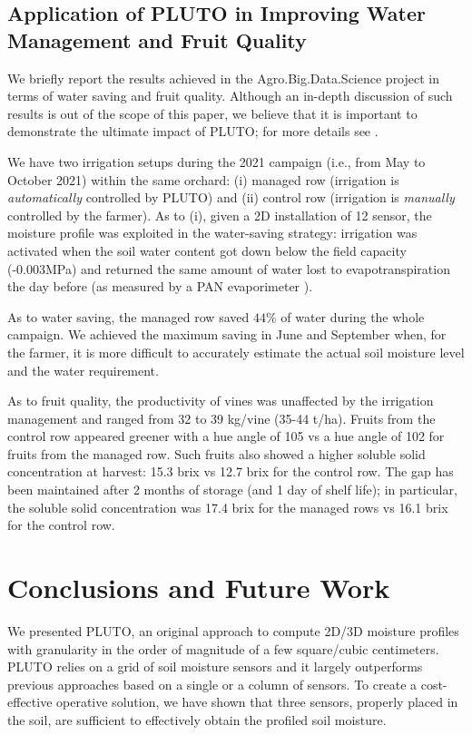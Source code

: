 \subsection{Application of PLUTO in Improving Water Management and Fruit Quality}
\label{pluto-sec:FruitQuality}
We briefly report the results achieved in the Agro.Big.Data.Science project in terms of water saving and fruit quality. Although an in-depth discussion of such results is out of the scope of this paper, we believe that it is important to demonstrate the ultimate impact of PLUTO; for more details see \cite{quartieri2021effect}. 

We have two irrigation setups during the 2021 campaign (i.e., from May to October 2021) within the same orchard: (i) managed row (irrigation is \textit{automatically} controlled by PLUTO) and (ii) control row (irrigation is \textit{manually} controlled by the farmer). As to (i), given a 2D installation of 12 sensor, the moisture profile was exploited in the water-saving strategy: irrigation was activated when the soil water content got down below the field capacity (-0.003MPa) and returned the same amount of water lost to evapotranspiration the day before (as measured by a PAN evaporimeter \cite{quartieri2021effect}).

As to water saving, the managed row saved $44\%$ of water during the whole campaign. We achieved the maximum saving in June and September when, for the farmer, it is more difficult to accurately estimate the actual soil moisture level and the water requirement.

As to fruit quality, the productivity of vines was unaffected by the irrigation management and ranged from 32 to 39 kg/vine (35-44 t/ha). Fruits from the control row appeared greener with a hue angle of 105 vs a hue angle of 102 for fruits from the managed row. Such fruits also showed a higher soluble solid concentration at harvest: 15.3 brix vs 12.7 brix for the control row. The gap has been maintained after 2 months of storage (and 1 day of shelf life); in particular, the soluble solid concentration was 17.4 brix for the managed rows vs 16.1 brix for the control row.


\section{Conclusions and Future Work}
\label{pluto-sec:conclusions}
We presented PLUTO, an original approach to compute 2D/3D moisture profiles with granularity in the order of magnitude of a few square/cubic centimeters. 
PLUTO relies on a grid of soil moisture sensors and it largely outperforms previous approaches based on a single or a column of sensors. 
To create a  cost-effective operative solution, we have shown that three sensors, properly placed in the soil, are sufficient %
to effectively obtain the profiled soil moisture.

